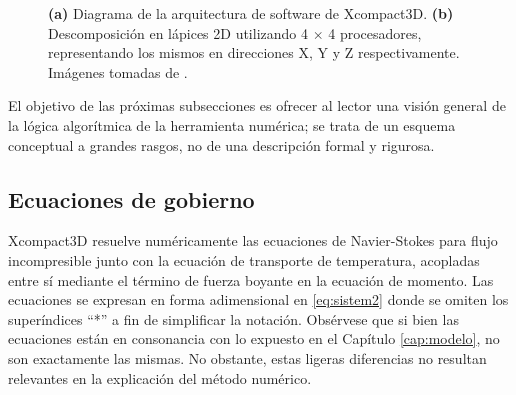 \begin{figure}[H]
 \centering
    
 \caption{\textbf{(a)} Diagrama de la arquitectura de software de Xcompact3D. \textbf{(b)} Descomposición en lápices 2D utilizando 4 $\times$ 4 procesadores, representando los mismos en direcciones X, Y y Z respectivamente. Imágenes tomadas de \cite{bartholomew2020xcompact3d}.} 
 \label{fig:xc3d}
\end{figure}

El objetivo de las próximas subsecciones es ofrecer al lector una visión general de la lógica algorítmica de la herramienta numérica; se trata de un esquema conceptual a grandes rasgos, no de una descripción formal y rigurosa.

\subsection{Ecuaciones de gobierno}

Xcompact3D resuelve numéricamente las ecuaciones de Navier-Stokes para flujo incompresible junto con la ecuación de transporte de temperatura, acopladas entre sí mediante el término de fuerza boyante en la ecuación de momento. Las ecuaciones se expresan en forma adimensional en \ref{eq:sistem2} donde se omiten los superíndices ``*'' a fin de simplificar la notación. Obsérvese que si bien las ecuaciones están en consonancia con lo expuesto en el Capítulo \ref{cap:modelo}, no son exactamente las mismas. No obstante, estas ligeras diferencias no resultan relevantes en la explicación del método numérico.

